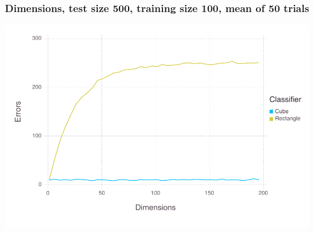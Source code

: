 \documentclass[a4paper,12pt]{article}
\begin{document}
\subsubsection*{Dimensions, test size 500, training size 100, mean of 50 trials}
\includegraphics[width=\linewidth]{figures/problemset3_3_1.pdf}
\end{document}
